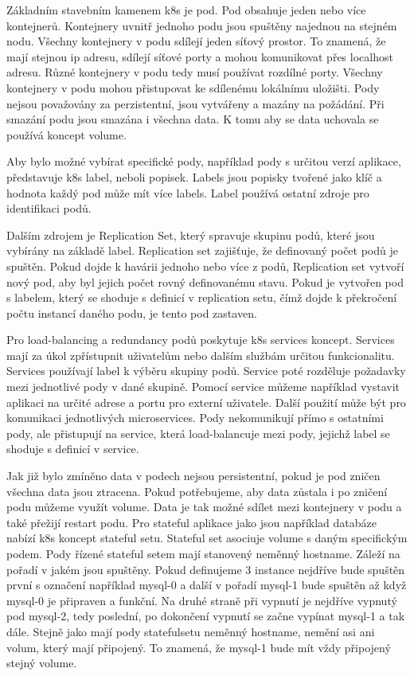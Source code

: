 Základním stavebním kamenem k8s je pod. Pod obsahuje jeden nebo více kontejnerů. Kontejnery uvnitř jednoho podu jsou spuštěny najednou na stejném nodu. \linebreak Všechny kontejnery v podu sdílejí jeden síťový prostor. To znamená, že mají stejnou ip adresu, sdílejí síťové porty a mohou komunikovat přes localhost adresu. Různé kontejnery v podu tedy musí používat rozdílné porty. Všechny kontejnery v podu mohou přistupovat ke sdílenému lokálnímu uložišti. Pody nejsou považovány za perzistentní, jsou vytvářeny a mazány na požádání. Při smazání podu jsou smazána i všechna data. K tomu aby se data uchovala se používá koncept volume.\par
Aby bylo možné vybírat specifické pody, například pody s určitou verzí aplikace, představuje k8s label, neboli popisek. Labels jsou popisky tvořené jako klíč a hodnota každý pod může mít více labels. Label používá ostatní zdroje pro identifikaci podů.\par
Dalším zdrojem je Replication Set, který spravuje skupinu podů, které jsou vybírány na základě label. Replication set zajišťuje, že definovaný počet podů je spuštěn. Pokud dojde k havárii jednoho nebo více z podů, Replication set vytvoří nový pod, aby byl jejich počet rovný definovanému stavu. Pokud je vytvořen pod s labelem, který se shoduje s definicí v replication setu, čímž dojde k překročení počtu instancí daného podu, je tento pod zastaven. \par
Pro load-balancing a redundancy podů poskytuje k8s services koncept. Services mají za úkol zpřístupnit uživatelům nebo dalším službám určitou funkcionalitu. Services používají label k výběru skupiny podů. Service poté rozděluje požadavky mezi jednotlivé pody v dané skupině. Pomocí service můžeme například vystavit aplikaci na určité adrese a portu pro externí uživatele. Další použití může být pro komunikaci jednotlivých microservices. Pody nekomunikují přímo s ostatními pody, ale přistupují na service, která load-balancuje mezi pody, jejichž label se shoduje s definicí v service.\par
Jak již bylo zmíněno data v podech nejsou persistentní, pokud je pod zničen všechna data jsou ztracena. Pokud potřebujeme, aby data zůstala i po zničení podu můžeme využít volume. Data je tak možné sdílet mezi kontejnery v podu a také přežijí restart podu. Pro stateful aplikace jako jsou například databáze nabízí k8s koncept stateful setu. Stateful set asociuje volume s daným specifickým podem. Pody řízené stateful setem mají stanovený neměnný hostname. Záleží na pořadí v jakém jsou spuštěny. Pokud definujeme 3 instance nejdříve bude spuštěn první s označení například mysql-0 a další v pořadí mysql-1 bude spuštěn až když mysql-0 je připraven a funkční. Na druhé straně při vypnutí je nejdříve vypnutý pod mysql-2, tedy poslední, po dokončení vypnutí se začne vypínat mysql-1 a tak dále. Stejně jako mají pody statefulsetu neměnný hostname, nemění asi ani volum, který mají připojený. To znamená, že mysql-1 bude mít vždy připojený stejný volume.\par
